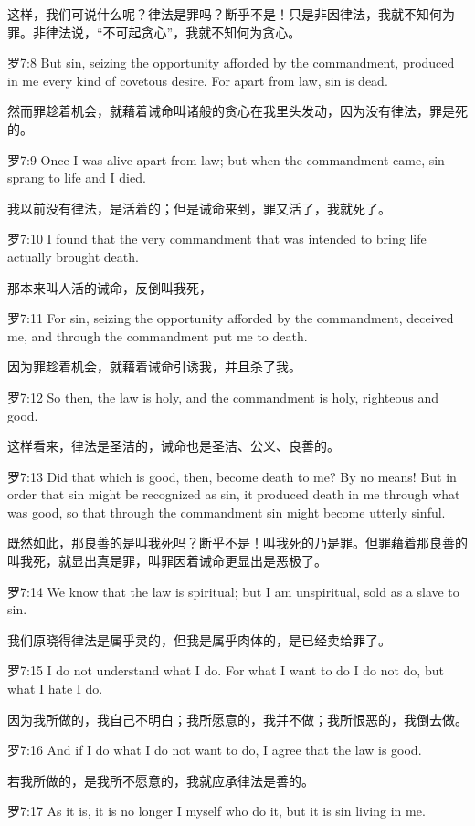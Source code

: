 \documentclass[a4paper,11pt,onecolumn,twoside]{ctexart}
\begin{document}
\begin{multicols}{2}
 这样，我们可说什么呢？律法是罪吗？断乎不是！只是非因律法，我就不知何为罪。非律法说，“不可起贪心”，我就不知何为贪心。


 罗7:8
 But sin, seizing the opportunity afforded by the commandment, produced in me every kind of covetous desire. For apart from law, sin is dead.

 然而罪趁着机会，就藉着诫命叫诸般的贪心在我里头发动，因为没有律法，罪是死的。


 罗7:9
 Once I was alive apart from law; but when the commandment came, sin sprang to life and I died.

 我以前没有律法，是活着的；但是诫命来到，罪又活了，我就死了。


 罗7:10
 I found that the very commandment that was intended to bring life actually brought death.

 那本来叫人活的诫命，反倒叫我死，


 罗7:11
 For sin, seizing the opportunity afforded by the commandment, deceived me, and through the commandment put me to death.

 因为罪趁着机会，就藉着诫命引诱我，并且杀了我。


 罗7:12
 So then, the law is holy, and the commandment is holy, righteous and good.

 这样看来，律法是圣洁的，诫命也是圣洁、公义、良善的。


 罗7:13
 Did that which is good, then, become death to me? By no means! But in order that sin might be recognized as sin, it produced death in me through what was good, so that through the commandment sin might become utterly sinful.

 既然如此，那良善的是叫我死吗？断乎不是！叫我死的乃是罪。但罪藉着那良善的叫我死，就显出真是罪，叫罪因着诫命更显出是恶极了。


 罗7:14
 We know that the law is spiritual; but I am unspiritual, sold as a slave to sin.

 我们原晓得律法是属乎灵的，但我是属乎肉体的，是已经卖给罪了。


 罗7:15
 I do not understand what I do. For what I want to do I do not do, but what I hate I do.

 因为我所做的，我自己不明白；我所愿意的，我并不做；我所恨恶的，我倒去做。


 罗7:16
 And if I do what I do not want to do, I agree that the law is good.

 若我所做的，是我所不愿意的，我就应承律法是善的。


 罗7:17
 As it is, it is no longer I myself who do it, but it is sin living in me.


\end{multicols}
\end{document}
